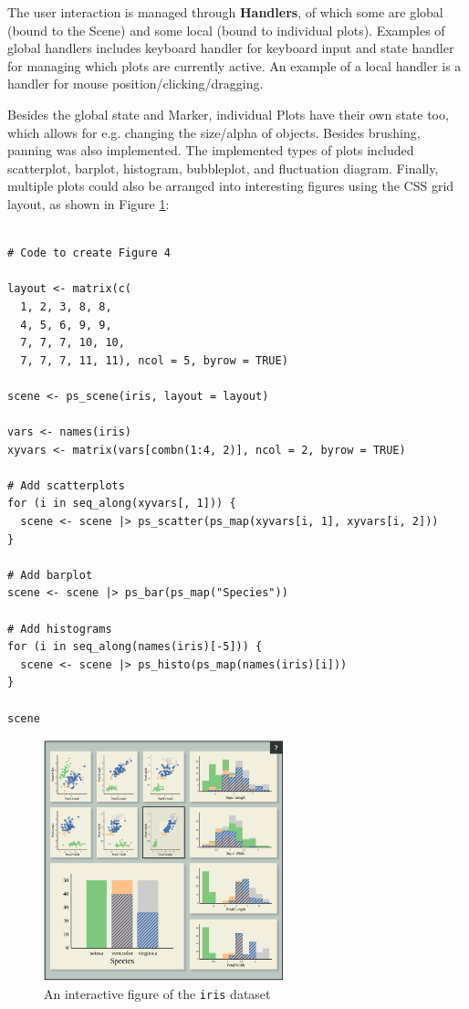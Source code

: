 \documentclass[12pt,a4paper]{article}
\begin{document}
The user interaction is managed through \textbf{Handlers}, of which some are global (bound to the Scene) and some local (bound to individual plots). Examples of global handlers includes keyboard handler for keyboard input and state handler for managing which plots are currently active. An example of a local handler is a handler for mouse position/clicking/dragging.  

Besides the global state and Marker, individual Plots have their own state too, which allows for e.g. changing the size/alpha of objects. Besides brushing, panning was also implemented. The implemented types of plots included scatterplot, barplot, histogram, bubbleplot, and fluctuation diagram. Finally, multiple plots could also be arranged into interesting figures using the CSS grid layout, as shown in Figure \ref{fig:plotscaperiris}:

\begin{verbatim}

# Code to create Figure 4

layout <- matrix(c(
  1, 2, 3, 8, 8,
  4, 5, 6, 9, 9,
  7, 7, 7, 10, 10,
  7, 7, 7, 11, 11), ncol = 5, byrow = TRUE)

scene <- ps_scene(iris, layout = layout)

vars <- names(iris)
xyvars <- matrix(vars[combn(1:4, 2)], ncol = 2, byrow = TRUE)

# Add scatterplots
for (i in seq_along(xyvars[, 1])) {
  scene <- scene |> ps_scatter(ps_map(xyvars[i, 1], xyvars[i, 2]))
}

# Add barplot
scene <- scene |> ps_bar(ps_map("Species"))

# Add histograms
for (i in seq_along(names(iris)[-5])) {
  scene <- scene |> ps_histo(ps_map(names(iris)[i]))
}

scene

\end{verbatim}

\begin{figure}[H]
\centering
\includegraphics[height=70mm]{./fig_plotscape4.png}
\caption{An interactive figure of the \texttt{iris} dataset}
\label{fig:plotscaperiris}
\end{figure}
\end{document}
